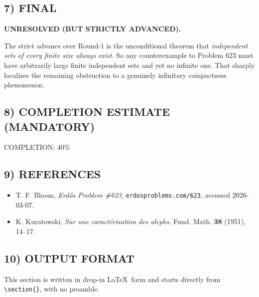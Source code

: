 \subsection*{7) FINAL}

\textbf{UNRESOLVED (BUT STRICTLY ADVANCED).}

The strict advance over Round-1 is the unconditional theorem that
\emph{independent sets of every finite size always exist}.
So any counterexample to Problem 623 must have arbitrarily large finite independent sets and yet no infinite one.
That sharply localizes the remaining obstruction to a genuinely infinitary compactness phenomenon.

\subsection*{8) COMPLETION ESTIMATE (MANDATORY)}

COMPLETION: 40\%

\subsection*{9) REFERENCES}

\begin{itemize}
\item T. F. Bloom, \emph{Erd\H{o}s Problem \#623}, \texttt{erdosproblems.com/623}, accessed 2026-03-07.
\item K. Kuratowski, \emph{Sur une caract\'erisation des alephs}, Fund. Math. \textbf{38} (1951), 14--17.
\end{itemize}

\subsection*{10) OUTPUT FORMAT}

This section is written in drop-in \LaTeX\ form and starts directly from \verb|\section{}|, with no preamble.

\bigskip

